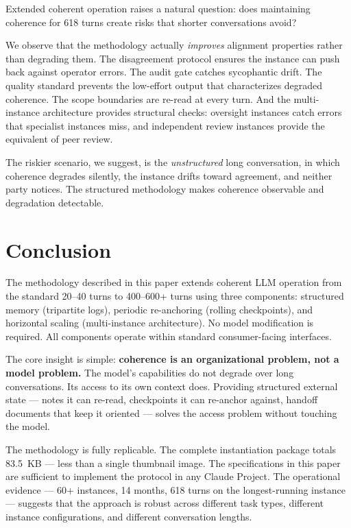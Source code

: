 \documentclass[11pt,a4paper]{article}
\begin{document}
Extended coherent operation raises a natural question: does maintaining coherence for 618 turns create risks that shorter conversations avoid?

We observe that the methodology actually \textit{improves} alignment properties rather than degrading them. The disagreement protocol ensures the instance can push back against operator errors. The audit gate catches sycophantic drift. The quality standard prevents the low-effort output that characterizes degraded coherence. The scope boundaries are re-read at every turn. And the multi-instance architecture provides structural checks: oversight instances catch errors that specialist instances miss, and independent review instances provide the equivalent of peer review.

The riskier scenario, we suggest, is the \textit{unstructured} long conversation, in which coherence degrades silently, the instance drifts toward agreement, and neither party notices. The structured methodology makes coherence observable and degradation detectable.


\section{Conclusion}

The methodology described in this paper extends coherent LLM operation from the standard 20--40 turns to 400--600+ turns using three components: structured memory (tripartite logs), periodic re-anchoring (rolling checkpoints), and horizontal scaling (multi-instance architecture). No model modification is required. All components operate within standard consumer-facing interfaces.

The core insight is simple: \textbf{coherence is an organizational problem, not a model problem.} The model's capabilities do not degrade over long conversations. Its access to its own context does. Providing structured external state --- notes it can re-read, checkpoints it can re-anchor against, handoff documents that keep it oriented --- solves the access problem without touching the model.

The methodology is fully replicable. The complete instantiation package totals 83.5~KB --- less than a single thumbnail image. The specifications in this paper are sufficient to implement the protocol in any Claude Project. The operational evidence --- 60+ instances, 14 months, 618 turns on the longest-running instance --- suggests that the approach is robust across different task types, different instance configurations, and different conversation lengths.
\end{document}

